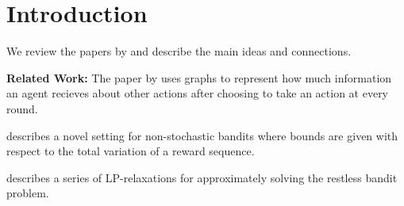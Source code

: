 \section{Introduction}

We review the papers by
\citep{alon, hazan, bertsimas} and describe the main ideas and connections. 

\textbf{Related Work:} 
The paper by 
\citep{alon} uses graphs to represent how much information an agent recieves about 
other actions after choosing to take an action at every round. 

\citep{hazan} describes a novel setting for non-stochastic bandits where bounds are given with respect to the total variation of a reward sequence. 

\citep{bertsimas} describes a series of LP-relaxations for approximately solving
the restless bandit problem.
